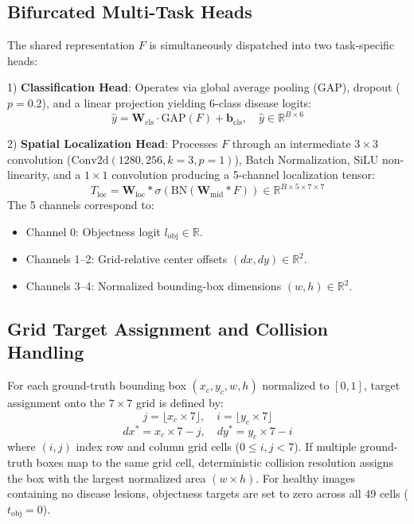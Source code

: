 \documentclass[conference]{IEEEtran}
\begin{document}
\subsection{Bifurcated Multi-Task Heads}
The shared representation $F$ is simultaneously dispatched into two task-specific heads:

1) \textbf{Classification Head}: Operates via global average pooling ($\text{GAP}$), dropout ($p=0.2$), and a linear projection yielding 6-class disease logits:
\begin{equation}
\hat{y} = \mathbf{W}_{\text{cls}} \cdot \text{GAP}(F) + \mathbf{b}_{\text{cls}}, \quad \hat{y} \in \mathbb{R}^{B \times 6}
\end{equation}

2) \textbf{Spatial Localization Head}: Processes $F$ through an intermediate $3\times 3$ convolution ($\text{Conv2d}(1280, 256, k=3, p=1)$), Batch Normalization, SiLU non-linearity, and a $1\times 1$ convolution producing a 5-channel localization tensor:
\begin{equation}
T_{\text{loc}} = \mathbf{W}_{\text{loc}} * \sigma(\text{BN}(\mathbf{W}_{\text{mid}} * F)) \in \mathbb{R}^{B \times 5 \times 7 \times 7}
\end{equation}
The 5 channels correspond to:
\begin{itemize}
    \item Channel 0: Objectness logit $l_{\text{obj}} \in \mathbb{R}$.
    \item Channels 1--2: Grid-relative center offsets $(dx, dy) \in \mathbb{R}^2$.
    \item Channels 3--4: Normalized bounding-box dimensions $(w, h) \in \mathbb{R}^2$.
\end{itemize}

\subsection{Grid Target Assignment and Collision Handling}
For each ground-truth bounding box $(x_c, y_c, w, h)$ normalized to $[0, 1]$, target assignment onto the $7 \times 7$ grid is defined by:
\begin{equation}
j = \lfloor x_c \times 7 \rfloor, \quad i = \lfloor y_c \times 7 \rfloor
\end{equation}
\begin{equation}
dx^* = x_c \times 7 - j, \quad dy^* = y_c \times 7 - i
\end{equation}
where $(i, j)$ index row and column grid cells ($0 \le i, j < 7$). If multiple ground-truth boxes map to the same grid cell, deterministic collision resolution assigns the box with the largest normalized area $(w \times h)$. For healthy images containing no disease lesions, objectness targets are set to zero across all 49 cells ($t_{\text{obj}} = 0$).
\end{document}
